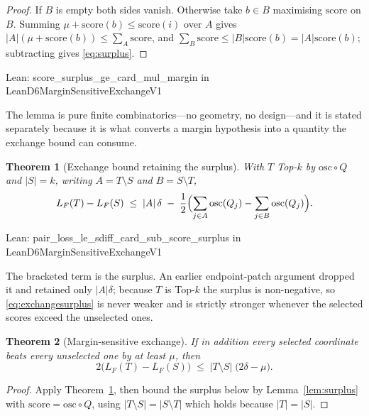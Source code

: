 \documentclass[conference]{IEEEtran}
\newtheorem{theorem}{Theorem}
\theoremstyle{definition}
\newcommand{\lean}[1]{\textsf{\footnotesize #1}}
\newcommand{\leanbox}[1]{%
  \par\vspace{2pt}\noindent
  {\footnotesize\textsf{Lean: #1}}\par\vspace{2pt}}
\begin{document}
\begin{proof}
If $B$ is empty both sides vanish. Otherwise take $b\in B$ maximising $\mathrm{score}$ on
$B$. Summing $\mu+\mathrm{score}(b)\le\mathrm{score}(i)$ over $A$ gives
$|A|(\mu+\mathrm{score}(b))\le\sum_{A}\mathrm{score}$, and
$\sum_{B}\mathrm{score}\le|B|\mathrm{score}(b)=|A|\mathrm{score}(b)$; subtracting gives
\eqref{eq:surplus}.
\end{proof}

\leanbox{\lean{score\_surplus\_ge\_card\_mul\_margin} in
\lean{LeanD6MarginSensitiveExchangeV1}}

The lemma is pure finite combinatorics---no geometry, no design---and it is stated separately
because it is what converts a margin hypothesis into a quantity the exchange bound can
consume.

\begin{theorem}[Exchange bound retaining the surplus]
\label{thm:exchange}
With $T$ Top-$k$ by $\mathrm{osc}\circ Q$ and $|S|=k$, writing $A=T\setminus S$ and
$B=S\setminus T$,
\begin{equation}
L_{F}(T)-L_{F}(S)\;\leq\;|A|\,\delta
 \;-\;\frac{1}{2}\Bigl(\sum_{j\in A}\mathrm{osc}(Q_{j})-\sum_{j\in B}\mathrm{osc}(Q_{j})\Bigr).
\label{eq:exchangesurplus}
\end{equation}
\end{theorem}

\leanbox{\lean{pair\_loss\_le\_sdiff\_card\_sub\_score\_surplus} in
\lean{LeanD6MarginSensitiveExchangeV1}}

The bracketed term is the surplus. An earlier endpoint-patch argument dropped it and retained
only $|A|\delta$; because $T$ is Top-$k$ the surplus is non-negative, so
\eqref{eq:exchangesurplus} is never weaker and is strictly stronger whenever the selected
scores exceed the unselected ones.

\begin{theorem}[Margin-sensitive exchange]
\label{thm:marginexchange}
If in addition every selected coordinate beats every unselected one by at least $\mu$, then
\begin{equation}
2\bigl(L_{F}(T)-L_{F}(S)\bigr)\;\leq\;|T\setminus S|\;\bigl(2\delta-\mu\bigr).
\label{eq:marginexchange}
\end{equation}
\end{theorem}

\begin{proof}
Apply Theorem~\ref{thm:exchange}, then bound the surplus below by Lemma~\ref{lem:surplus}
with $\mathrm{score}=\mathrm{osc}\circ Q$, using $|T\setminus S|=|S\setminus T|$ which holds
because $|T|=|S|$.
\end{proof}
\end{document}
